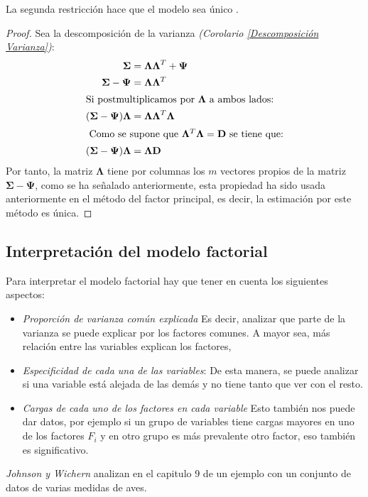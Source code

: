 \begin{propo}
La segunda restricción hace que el modelo sea único \cite{Peña 2002}. 
\begin{proof}
Sea la descomposición de la varianza \emph{(Corolario \ref{Descomposición Varianza})}: \begin{align*}
\mathbf{\Sigma}&=\mathbf{\Lambda\Lambda}^T+\mathbf{\Psi}\\
\mathbf{\Sigma}-\mathbf{\Psi}&=\mathbf{\Lambda\Lambda}^T\\
\intertext{Si postmultiplicamos por $\mathbf{\Lambda}$ a ambos lados:}
(\mathbf{\Sigma}-\mathbf{\Psi})\mathbf{\Lambda}&=\mathbf{\Lambda\Lambda}^T \mathbf{\Lambda}\\
\intertext{ Como se supone que $\mathbf{\Lambda}^T \mathbf{\Lambda}=\mathbf{D}$ se tiene que:}
(\mathbf{\Sigma}-\mathbf{\Psi})\mathbf{\Lambda}&=\mathbf{\Lambda D}
\end{align*}
Por tanto, la matriz $\mathbf{\Lambda}$ tiene por columnas los $m$ vectores propios de la matriz $\mathbf{\Sigma-\Psi}$, como se ha señalado anteriormente, esta propiedad ha sido usada anteriormente en el método del factor principal, es decir, la estimación por este método es única. 
\end{proof}
\end{propo}
\subsection{Interpretación del modelo factorial}

\noindent Para interpretar el modelo factorial hay que tener en cuenta los siguientes aspectos:
\begin{itemize}
\item \emph{Proporción de varianza común explicada} Es decir, analizar que parte de la varianza se puede explicar por los factores comunes. A mayor sea, más relación entre las variables explican los factores, 
\item \emph{Especificidad de cada una de las variables}: De esta manera, se puede analizar si una variable está alejada de las demás y no tiene tanto que ver con el resto. 
\item \emph{Cargas de cada uno de los factores en cada variable} Esto también nos puede dar datos, por ejemplo si un grupo de variables tiene cargas mayores en uno de los factores $F_i$ y en otro grupo es más prevalente otro factor, eso también es significativo. 
\end{itemize}

\noindent \emph{Johnson y Wichern } analizan en el capitulo 9 de \cite{Johnson 2007} un ejemplo con un conjunto de datos de varias medidas de aves. 


